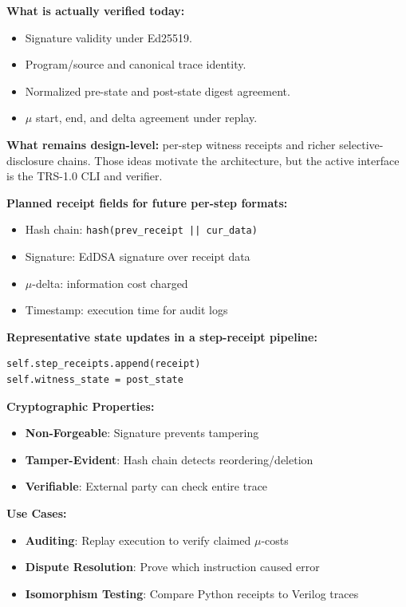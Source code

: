\textbf{What is actually verified today:}
\begin{itemize}
    \item Signature validity under Ed25519.
    \item Program/source and canonical trace identity.
    \item Normalized pre-state and post-state digest agreement.
    \item $\mu$ start, end, and delta agreement under replay.
\end{itemize}

\textbf{What remains design-level:} per-step witness receipts and richer selective-disclosure chains. Those ideas motivate the architecture, but the active interface is the TRS-1.0 CLI and verifier.

\textbf{Planned receipt fields for future per-step formats:}
\begin{itemize}
    \item Hash chain: \texttt{hash(prev\_receipt || cur\_data)}
    \item Signature: EdDSA signature over receipt data
    \item $\mu$-delta: information cost charged
    \item Timestamp: execution time for audit logs
\end{itemize}

\textbf{Representative state updates in a step-receipt pipeline:}
\begin{lstlisting}
self.step_receipts.append(receipt)
self.witness_state = post_state
\end{lstlisting}

\textbf{Cryptographic Properties:}
\begin{itemize}
    \item \textbf{Non-Forgeable}: Signature prevents tampering
    \item \textbf{Tamper-Evident}: Hash chain detects reordering/deletion
    \item \textbf{Verifiable}: External party can check entire trace
\end{itemize}

\textbf{Use Cases:}
\begin{itemize}
    \item \textbf{Auditing}: Replay execution to verify claimed $\mu$-costs
    \item \textbf{Dispute Resolution}: Prove which instruction caused error
    \item \textbf{Isomorphism Testing}: Compare Python receipts to Verilog traces
\end{itemize}


